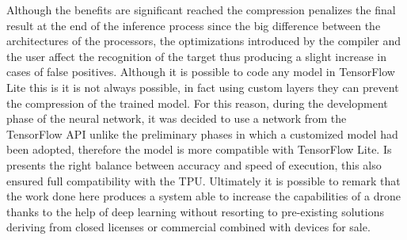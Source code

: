 Although the benefits are significant reached the compression penalizes the
final result at the end of the inference process since the big difference
between the architectures of the processors, the optimizations introduced by the
compiler and the user affect the recognition of the target thus producing a
slight increase in cases of false positives.
Although it is possible to code any model in TensorFlow Lite this is it is not
always possible, in fact using custom layers they can prevent the compression of
the trained model.
For this reason, during the development phase of the neural network, it was
decided to use a network from the TensorFlow API unlike the preliminary phases
in which a customized model had been adopted, therefore the model is more
compatible with TensorFlow Lite. 
Is presents the right balance between accuracy and speed of execution, this also
ensured full compatibility with the TPU.
Ultimately it is possible to remark that the work done here produces a system
able to increase the capabilities of a drone thanks to the help of deep learning
without resorting to pre-existing solutions deriving from closed licenses or
commercial combined with devices for sale.